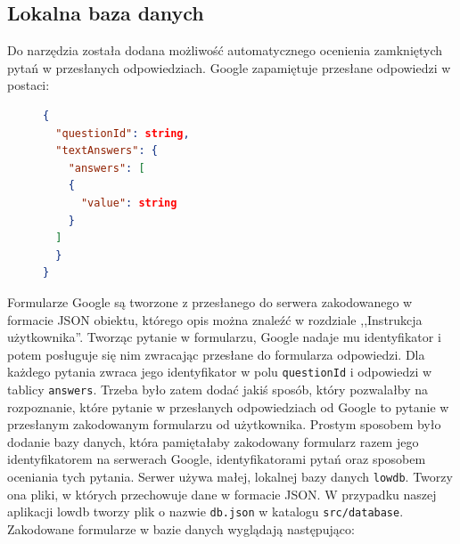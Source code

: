 \subsection{Lokalna baza danych}
Do narzędzia została dodana możliwość automatycznego ocenienia zamkniętych pytań w 
przesłanych odpowiedziach. Google zapamiętuje przesłane odpowiedzi w postaci:
\begin{figure}[H]
  \begin{lstlisting}[language=json,firstnumber=1]
{
  "questionId": string,
  "textAnswers": {
    "answers": [
    {
      "value": string
    }
  ]
  }
}
  \end{lstlisting}
\end{figure}
Formularze Google są tworzone z przesłanego do serwera zakodowanego w formacie JSON obiektu,
którego opis można znaleźć w rozdziale ,,Instrukcja użytkownika''.
Tworząc pytanie w formularzu, Google nadaje mu identyfikator i potem posługuje się nim
zwracając przesłane do formularza odpowiedzi. Dla każdego pytania zwraca jego identyfikator 
w polu \texttt{questionId} i odpowiedzi w tablicy \texttt{answers}. Trzeba było zatem dodać
jakiś sposób, który pozwalałby na rozpoznanie, które pytanie w przesłanych odpowiedziach od 
Google to pytanie w przesłanym zakodowanym formularzu od użytkownika. Prostym sposobem było
dodanie bazy danych, która pamiętałaby zakodowany formularz razem jego identyfikatorem 
na serwerach Google, identyfikatorami pytań oraz sposobem oceniania tych pytania. Serwer
używa małej, lokalnej bazy
danych \texttt{lowdb}. Tworzy ona pliki, w których przechowuje dane w formacie JSON.
W przypadku naszej aplikacji lowdb tworzy plik o nazwie \texttt{db.json} w katalogu 
\texttt{src/database}. Zakodowane formularze w bazie danych wyglądają następująco:

